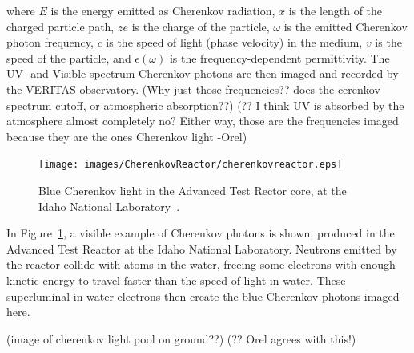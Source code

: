   where $E$ is the energy emitted as Cherenkov radiation, $x$ is the length of the charged particle path, $ze$ is the charge of the particle, $\omega$ is the emitted Cherenkov photon frequency, $c$ is the speed of light (phase velocity) in the medium, $v$ is the speed of the particle, and $\epsilon(\omega)$ is the frequency-dependent permittivity.
  The UV- and Visible-spectrum Cherenkov photons are then imaged and recorded by the VERITAS observatory.
  {\color{red}(Why just those frequencies?? does the cerenkov spectrum cutoff, or atmospheric absorption??)}
  {\color{red}(?? I think UV is absorbed by the atmosphere almost completely no?  Either way, those are the frequencies imaged because they are the ones Cherenkov light -Orel)}
  
  \begin{figure}[ht]
    \centering
    \texttt{[image: images/CherenkovReactor/cherenkovreactor.eps]}
    \caption[Chernekov Light from a Reactor]{
      Blue Cherenkov light in the Advanced Test Rector core, at the Idaho National Laboratory~\cite{cherenkovreactor,atrlab}.
    }
    \label{fig:cherenkovreactor}
  \end{figure}
  
  In Figure~\ref{fig:cherenkovreactor}, a visible example of Cherenkov photons is shown, produced in the Advanced Test Reactor at the Idaho National Laboratory.
  Neutrons emitted by the reactor collide with atoms in the water, freeing some electrons with enough kinetic energy to travel faster than the speed of light in water.
  These superluminal-in-water electrons then create the blue Cherenkov photons imaged here.
  
  {\color{red}(image of cherenkov light pool on ground??)}
  {\color{red}(?? Orel agrees with this!)}
  
  

